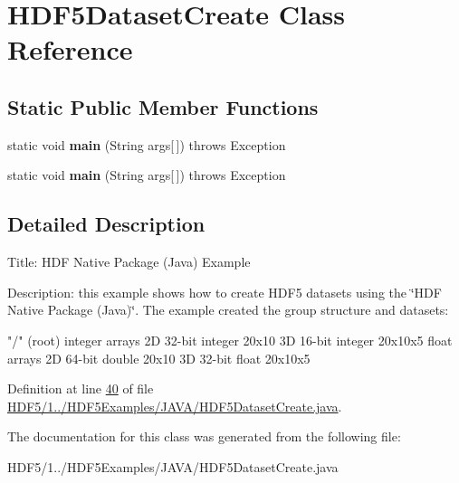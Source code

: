 \hypertarget{class_h_d_f5_dataset_create}{}\section{H\+D\+F5\+Dataset\+Create Class Reference}
\label{class_h_d_f5_dataset_create}
\subsection*{Static Public Member Functions}
\begin{DoxyCompactItemize}
\item 
\mbox{\label{class_h_d_f5_dataset_create_a815212bb7963978844f04a87a6b759c1}} 
static void {\bfseries main} (String args\mbox{[}$\,$\mbox{]})  throws Exception 
\item 
\mbox{\label{class_h_d_f5_dataset_create_a815212bb7963978844f04a87a6b759c1}} 
static void {\bfseries main} (String args\mbox{[}$\,$\mbox{]})  throws Exception 
\end{DoxyCompactItemize}


\subsection{Detailed Description}
Title\+: H\+DF Native Package (Java) Example 

Description\+: this example shows how to create H\+D\+F5 datasets using the \char`\"{}\+H\+D\+F Native Package (\+Java)\char`\"{}. The example created the group structure and datasets\+:


\begin{DoxyPre}
    "/" (root)
        integer arrays
            2D 32-bit integer 20x10
            3D 16-bit integer 20x10x5
        float arrays
            2D 64-bit double 20x10
            3D 32-bit float  20x10x5
\end{DoxyPre}


Definition at line \hyperlink{_h_d_f5_21_810_81_2_h_d_f5_examples_2_j_a_v_a_2_h_d_f5_dataset_create_8java_source_l00040}{40} of file \hyperlink{_h_d_f5_21_810_81_2_h_d_f5_examples_2_j_a_v_a_2_h_d_f5_dataset_create_8java_source}{H\+D\+F5/1../\+H\+D\+F5\+Examples/\+J\+A\+V\+A/\+H\+D\+F5\+Dataset\+Create.\+java}.



The documentation for this class was generated from the following file\+:\begin{DoxyCompactItemize}
\item 
H\+D\+F5/1../\+H\+D\+F5\+Examples/\+J\+A\+V\+A/\+H\+D\+F5\+Dataset\+Create.\+java\end{DoxyCompactItemize}
